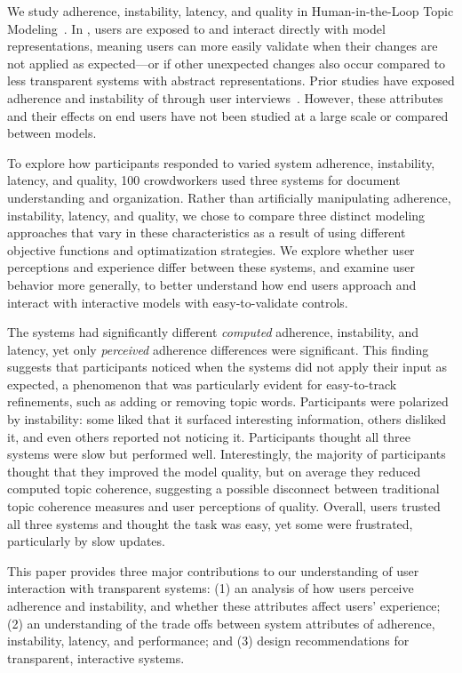 We study adherence, instability, latency, and quality in Human-in-the-Loop Topic Modeling~\cite[\hltm{}]{Andrzejewski2009IncorporatingPriors}. In \hltm{}, users are exposed to and interact directly with model representations, meaning users can more easily validate when their changes are not applied as expected---or if other unexpected changes also occur compared to less transparent systems with abstract representations. Prior studies have exposed adherence and instability of \hltm{} through user interviews~\cite{Smith2018ClosingSystem,Lee2017TheModels}. However, these attributes and their effects on end users have
not been studied at a large scale or compared between models.

To explore how participants responded to varied system adherence, instability, latency, and quality, 100 crowdworkers used
three \hltm{} systems for document understanding and organization.  
Rather than artificially manipulating adherence, instability, latency, and quality, we chose to compare three distinct modeling approaches that vary in these characteristics as a result of using different objective functions and optimatization strategies.
We explore whether user perceptions and experience differ between these systems,
and examine user behavior more generally, to better understand how end users approach and interact with interactive models with easy-to-validate controls.

The systems had significantly different \textit{computed} adherence, instability, and latency, yet only \textit{perceived} adherence differences were significant.
This finding suggests that participants noticed when the systems did not apply their input as expected, a phenomenon that  was particularly evident for easy-to-track refinements, such as adding or removing topic words. Participants were polarized by instability: some liked that it surfaced interesting information, others disliked it, and even others reported not noticing it.
Participants thought all three systems were slow but performed well. Interestingly, the majority of participants thought that they improved the model quality, but on average they reduced computed topic coherence, suggesting a possible disconnect between traditional topic coherence measures and user perceptions of \hltm{} quality.
Overall, users trusted all three systems and thought the task was easy, yet some were frustrated, particularly by slow updates.


This paper provides three major contributions to our understanding of user interaction with transparent systems:  (1) an analysis of how users perceive adherence and instability, and whether these attributes affect users' experience; (2) an understanding of the trade offs between system attributes of adherence, instability, latency, and performance; and (3) design recommendations for transparent, interactive systems.

